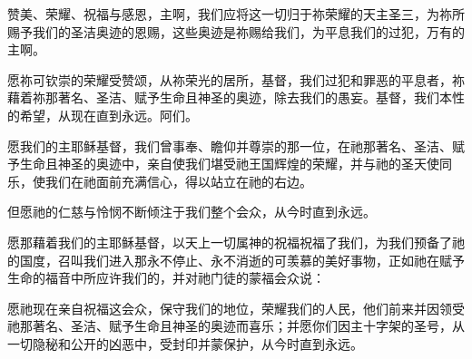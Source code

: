 \par

赞美、荣耀、祝福与感恩，主啊，我们应将这一切归于祢荣耀的天主圣三，为祢所赐予我们的圣洁奥迹的恩赐，这些奥迹是祢赐给我们，为平息我们的过犯，万有的主啊。\par

\par

愿祢可钦崇的荣耀受赞颂，从祢荣光的居所，基督，我们过犯和罪恶的平息者，祢藉着祢那著名、圣洁、赋予生命且神圣的奥迹，除去我们的愚妄。基督，我们本性的希望，从现在直到永远。阿们。\par

\par

愿我们的主耶稣基督，我们曾事奉、瞻仰并尊崇的那一位，在祂那著名、圣洁、赋予生命且神圣的奥迹中，亲自使我们堪受祂王国辉煌的荣耀，并与祂的圣天使同乐，使我们在祂面前充满信心，得以站立在祂的右边。\par

但愿祂的仁慈与怜悯不断倾注于我们整个会众，从今时直到永远。\par

\par

愿那藉着我们的主耶稣基督，以天上一切属神的祝福祝福了我们，为我们预备了祂的国度，召叫我们进入那永不停止、永不消逝的可羡慕的美好事物，正如祂在赋予生命的福音中所应许我们的，并对祂门徒的蒙福会众说：\par

愿祂现在亲自祝福这会众，保守我们的地位，荣耀我们的人民，他们前来并因领受祂那著名、圣洁、赋予生命且神圣的奥迹而喜乐；并愿你们因主十字架的圣号，从一切隐秘和公开的凶恶中，受封印并蒙保护，从今时直到永远。\par

